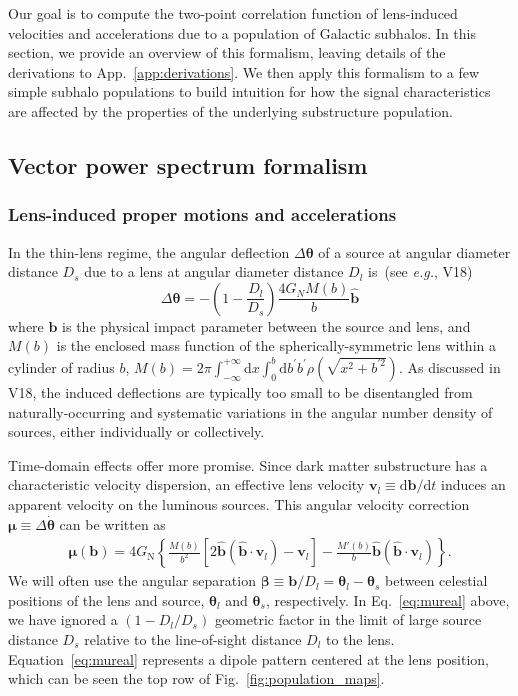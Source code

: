 \documentclass[prd,aps,10pt,nofootinbib,twocolumn,superscriptaddress,preprintnumbers,balancelastpage,longbibliography]{revtex4-1}
\newcommand{\vect}[1]{\boldsymbol{\mathbf{#1}}}
\newcommand{\dd}{\mathrm{d}}
\newcommand{\GN}{G_\mathrm{N}}
\begin{document}
Our goal is to compute the two-point correlation function of lens-induced velocities and accelerations due to a population of Galactic subhalos. In this section, we provide an overview of this formalism, leaving details of the derivations to App.~\ref{app:derivations}. We then apply this formalism to a few simple subhalo populations to build intuition for how the signal characteristics are affected by the properties of the underlying substructure population.

\subsection{Vector power spectrum formalism}
\label{sec:formalism}

\subsubsection*{Lens-induced proper motions and accelerations}

In the thin-lens regime, the angular deflection $\Delta \boldsymbol{\theta}$ of a source at angular diameter distance $D_s$ due to a lens at angular diameter distance $D_l$ is~(see \emph{e.g.}, V18)
\begin{equation}
\Delta \boldsymbol{\theta}=-\left(1-\frac{D_{l}}{D_{s}}\right) \frac{4 G_{N} M(b)}{b} \hat{\mathbf{b}}
\end{equation}
where $\vect{b}$ is the physical impact parameter between the source and lens, and $M(b)$ is the enclosed mass function of the spherically-symmetric lens within a cylinder of radius $b$, $M\left(b\right)=2 \pi \int_{-\infty}^{+\infty} \mathrm{d} x \int_{0}^{b} \mathrm{d} b^{\prime} b^{\prime} \rho\left(\sqrt{x^{2}+b^{\prime 2}}\right)$. As discussed in V18, the induced deflections are typically too small to be disentangled from naturally-occurring and systematic variations in the angular number density of sources, either individually or collectively.

Time-domain effects offer more promise. Since dark matter substructure has a characteristic velocity dispersion, an effective lens velocity $\vect{v}_l \equiv {\dd \vect{b}}/{\dd t}$ induces an apparent velocity on the luminous sources. This angular velocity correction $\vect{\mu}\equiv\Delta\boldsymbol{\dot \theta}$ can be written as 
\begin{align}
\vect{\mu}(\vect{b}) = 4 \GN \left\lbrace \frac{M(b)}{b^2} \left[ 2 \hat{\vect{b}} (\hat{\vect{b}} \cdot \vect{v}_l) -  \vect{v}_l \right] -\frac{M'(b)}{b} \hat{\vect{b}} (\hat{\vect{b}} \cdot \vect{v}_l) \right\rbrace.
\label{eq:mureal}
\end{align}
We will often use the angular separation $\vect{\beta} \equiv \vect{b}/D_l = \vect{\theta}_l -  \vect{\theta}_s$  between celestial positions of the lens and source, $\vect{\theta}_l$ and $\vect{\theta}_s$, respectively. 
In Eq.~\ref{eq:mureal} above, we have ignored a $(1-{D_l}/{D_s})$ geometric factor in the limit of large source distance $D_s$ relative to the line-of-sight distance $D_l$ to the lens. Equation~\ref{eq:mureal} represents a dipole pattern centered at the lens position, which can be seen the top row of Fig.~\ref{fig:population_maps}.
\end{document}
